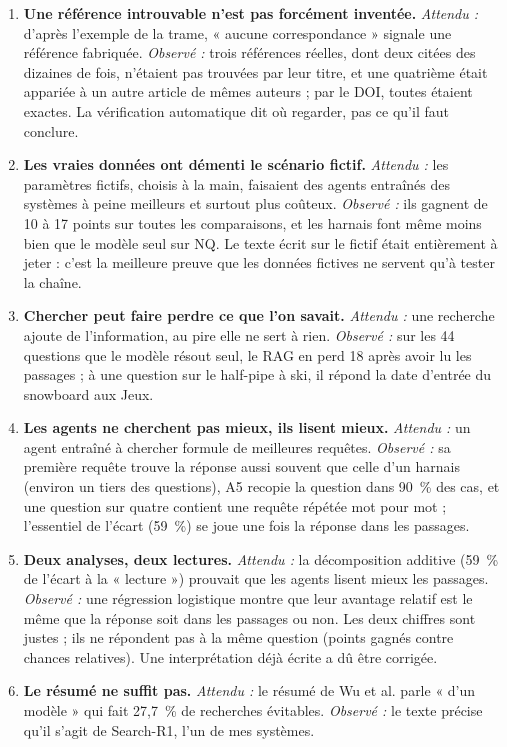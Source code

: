 \documentclass[10pt,a4paper]{article}
\begin{document}
\begin{enumerate}
\item \textbf{Une référence introuvable n'est pas forcément inventée.} \emph{Attendu :} d'après l'exemple de la trame, « aucune correspondance » signale une référence fabriquée. \emph{Observé :} trois références réelles, dont deux citées des dizaines de fois, n'étaient pas trouvées par leur titre, et une quatrième était appariée à un autre article de mêmes auteurs ; par le DOI, toutes étaient exactes. La vérification automatique dit où regarder, pas ce qu'il faut conclure.
\item \textbf{Les vraies données ont démenti le scénario fictif.} \emph{Attendu :} les paramètres fictifs, choisis à la main, faisaient des agents entraînés des systèmes à peine meilleurs et surtout plus coûteux. \emph{Observé :} ils gagnent de 10 à 17 points sur toutes les comparaisons, et les harnais font même moins bien que le modèle seul sur NQ. Le texte écrit sur le fictif était entièrement à jeter : c'est la meilleure preuve que les données fictives ne servent qu'à tester la chaîne.
\item \textbf{Chercher peut faire perdre ce que l'on savait.} \emph{Attendu :} une recherche ajoute de l'information, au pire elle ne sert à rien. \emph{Observé :} sur les 44 questions que le modèle résout seul, le RAG en perd 18 après avoir lu les passages ; à une question sur le half-pipe à ski, il répond la date d'entrée du snowboard aux Jeux.
\item \textbf{Les agents ne cherchent pas mieux, ils lisent mieux.} \emph{Attendu :} un agent entraîné à chercher formule de meilleures requêtes. \emph{Observé :} sa première requête trouve la réponse aussi souvent que celle d'un harnais (environ un tiers des questions), A5 recopie la question dans 90~\% des cas, et une question sur quatre contient une requête répétée mot pour mot ; l'essentiel de l'écart (59~\%) se joue une fois la réponse dans les passages.
\item \textbf{Deux analyses, deux lectures.} \emph{Attendu :} la décomposition additive (59~\% de l'écart à la « lecture ») prouvait que les agents lisent mieux les passages. \emph{Observé :} une régression logistique montre que leur avantage relatif est le même que la réponse soit dans les passages ou non. Les deux chiffres sont justes ; ils ne répondent pas à la même question (points gagnés contre chances relatives). Une interprétation déjà écrite a dû être corrigée.
\item \textbf{Le résumé ne suffit pas.} \emph{Attendu :} le résumé de Wu et al. parle « d'un modèle » qui fait 27,7~\% de recherches évitables. \emph{Observé :} le texte précise qu'il s'agit de Search-R1, l'un de mes systèmes.
\end{enumerate}
\end{document}
